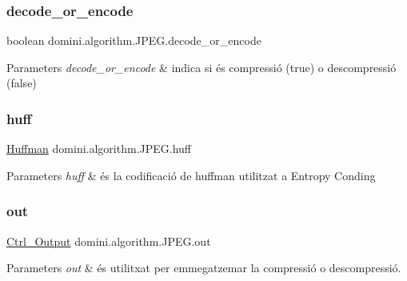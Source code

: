 \subsubsection{\texorpdfstring{decode\+\_\+or\+\_\+encode}{decode\_or\_encode}}
{\footnotesize\ttfamily boolean domini.\+algorithm.\+J\+P\+E\+G.\+decode\+\_\+or\+\_\+encode\hspace{0.3cm}{\ttfamily [package]}}


\begin{DoxyParams}{Parameters}
{\em decode\+\_\+or\+\_\+encode} & indica si és compressió (true) o descompressió (false) \\
\hline
\end{DoxyParams}
\mbox{\label{classdomini_1_1algorithm_1_1JPEG_aacc6445baa7819e3f9139ffb78e0b8f4}} 
\subsubsection{\texorpdfstring{huff}{huff}}
{\footnotesize\ttfamily \hyperlink{classdomini_1_1algorithm_1_1Huffman}{Huffman} domini.\+algorithm.\+J\+P\+E\+G.\+huff\hspace{0.3cm}{\ttfamily [package]}}


\begin{DoxyParams}{Parameters}
{\em huff} & és la codificació de huffman utilitzat a Entropy Conding \\
\hline
\end{DoxyParams}
\mbox{\label{classdomini_1_1algorithm_1_1JPEG_a2512a38136dac55fa5dbbfc8f0ae822d}} 
\subsubsection{\texorpdfstring{out}{out}}
{\footnotesize\ttfamily \hyperlink{classpersistencia_1_1output_1_1Ctrl__Output}{Ctrl\+\_\+\+Output} domini.\+algorithm.\+J\+P\+E\+G.\+out\hspace{0.3cm}{\ttfamily [package]}}


\begin{DoxyParams}{Parameters}
{\em out} & és utilitxat per emmegatzemar la compressió o descompressió. \\
\hline
\end{DoxyParams}
\mbox{\label{classdomini_1_1algorithm_1_1JPEG_a68d523efc6a9dfb3dd2edec0bbb79b48}} 
